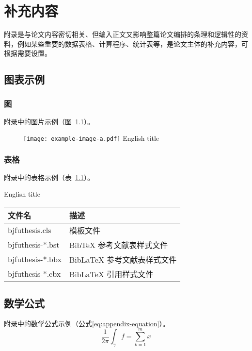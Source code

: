 
\chapter{补充内容}

附录是与论文内容密切相关、但编入正文又影响整篇论文编排的条理和逻辑性的资料，例如某些重要的数据表格、计算程序、统计表等，是论文主体的补充内容，可根据需要设置。


\section{图表示例}

\subsection{图}

附录中的图片示例（图~\ref{fig:appendix-figure}）。

\begin{figure}[h]
  \centering
  \texttt{[image: example-image-a.pdf]}
   {English title}
  \label{fig:appendix-figure}
\end{figure}


\subsection{表格}

附录中的表格示例（表~\ref{tab:appendix-table}）。

\begin{table}[h]
  \centering
   {English title}
  \begin{tabular}{ll}
    \toprule
    文件名          & 描述                         \\
    \midrule
    bjfuthesis.cls   & 模板文件                     \\
    bjfuthesis-*.bst & BibTeX 参考文献表样式文件    \\
    bjfuthesis-*.bbx & BibLaTeX 参考文献表样式文件  \\
    bjfuthesis-*.cbx & BibLaTeX 引用样式文件        \\
    \bottomrule
  \end{tabular}
  \label{tab:appendix-table}
\end{table}


\section{数学公式}

附录中的数学公式示例（公式\eqref{eq:appendix-equation}）。
\begin{equation}
  \frac{1}{2 \pi} \int_\gamma f = \sum_{k=1}^m  x
  \label{eq:appendix-equation}
\end{equation}
